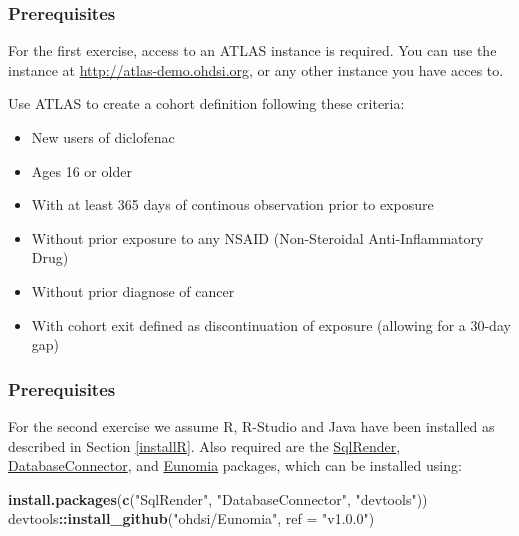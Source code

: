 \documentclass[11pt]{book}
\newenvironment{Shaded}{\begin{snugshade}}{\end{snugshade}}
\newcommand{\DataTypeTok}[1]{\textcolor[rgb]{0.13,0.29,0.53}{#1}}
\newcommand{\KeywordTok}[1]{\textcolor[rgb]{0.13,0.29,0.53}{\textbf{#1}}}
\newcommand{\NormalTok}[1]{#1}
\newcommand{\OperatorTok}[1]{\textcolor[rgb]{0.81,0.36,0.00}{\textbf{#1}}}
\newcommand{\StringTok}[1]{\textcolor[rgb]{0.31,0.60,0.02}{#1}}
\providecommand{\tightlist}{%
  \setlength{\itemsep}{0pt}\setlength{\parskip}{0pt}}
\theoremstyle{definition}
\theoremstyle{definition}
\theoremstyle{definition}
\theoremstyle{remark}
\let\BeginKnitrBlock\begin \let\EndKnitrBlock\end
\begin{document}
\hypertarget{prerequisites-2}{%
\subsubsection*{Prerequisites}\label{prerequisites-2}}

For the first exercise, access to an ATLAS instance is required. You can use the instance at \url{http://atlas-demo.ohdsi.org}, or any other instance you have acces to.

\BeginKnitrBlock{exercise}
\protect\hypertarget{exr:exerciseCohortsAtlas}{}{\label{exr:exerciseCohortsAtlas} }Use ATLAS to create a cohort definition following these criteria:

\begin{itemize}
\tightlist
\item
  New users of diclofenac
\item
  Ages 16 or older
\item
  With at least 365 days of continous observation prior to exposure
\item
  Without prior exposure to any NSAID (Non-Steroidal Anti-Inflammatory Drug)
\item
  Without prior diagnose of cancer
\item
  With cohort exit defined as discontinuation of exposure (allowing for a 30-day gap)
\end{itemize}
\EndKnitrBlock{exercise}

\hypertarget{prerequisites-3}{%
\subsubsection*{Prerequisites}\label{prerequisites-3}}

For the second exercise we assume R, R-Studio and Java have been installed as described in Section \ref{installR}. Also required are the \href{https://ohdsi.github.io/SqlRender/}{SqlRender}, \href{https://ohdsi.github.io/DatabaseConnector/}{DatabaseConnector}, and \href{https://ohdsi.github.io/Eunomia/}{Eunomia} packages, which can be installed using:

\begin{Shaded}
\begin{Highlighting}[]
\KeywordTok{install.packages}\NormalTok{(}\KeywordTok{c}\NormalTok{(}\StringTok{"SqlRender"}\NormalTok{, }\StringTok{"DatabaseConnector"}\NormalTok{, }\StringTok{"devtools"}\NormalTok{))}
\NormalTok{devtools}\OperatorTok{::}\KeywordTok{install_github}\NormalTok{(}\StringTok{"ohdsi/Eunomia"}\NormalTok{, }\DataTypeTok{ref =} \StringTok{"v1.0.0"}\NormalTok{)}
\end{Highlighting}
\end{Shaded}
\end{document}
